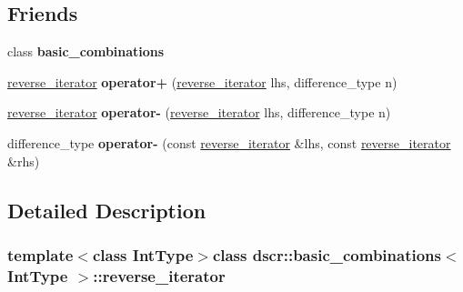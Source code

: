 \subsection*{Friends}
\begin{DoxyCompactItemize}
\item 
\hypertarget{classdscr_1_1basic__combinations_1_1reverse__iterator_a5aee9caa75ebeddad7d54e7f4931ce21}{class {\bfseries basic\-\_\-combinations}}\label{classdscr_1_1basic__combinations_1_1reverse__iterator_a5aee9caa75ebeddad7d54e7f4931ce21}

\item 
\hypertarget{classdscr_1_1basic__combinations_1_1reverse__iterator_a2c7fdd81f663381e951fb677763da73a}{\hyperlink{classdscr_1_1basic__combinations_1_1reverse__iterator}{reverse\-\_\-iterator} {\bfseries operator+} (\hyperlink{classdscr_1_1basic__combinations_1_1reverse__iterator}{reverse\-\_\-iterator} lhs, difference\-\_\-type n)}\label{classdscr_1_1basic__combinations_1_1reverse__iterator_a2c7fdd81f663381e951fb677763da73a}

\item 
\hypertarget{classdscr_1_1basic__combinations_1_1reverse__iterator_ad23e7d190001b7e889291da869e0e825}{\hyperlink{classdscr_1_1basic__combinations_1_1reverse__iterator}{reverse\-\_\-iterator} {\bfseries operator-\/} (\hyperlink{classdscr_1_1basic__combinations_1_1reverse__iterator}{reverse\-\_\-iterator} lhs, difference\-\_\-type n)}\label{classdscr_1_1basic__combinations_1_1reverse__iterator_ad23e7d190001b7e889291da869e0e825}

\item 
\hypertarget{classdscr_1_1basic__combinations_1_1reverse__iterator_a46fe9efd66cb5e2a2e89a93f2e060b82}{difference\-\_\-type {\bfseries operator-\/} (const \hyperlink{classdscr_1_1basic__combinations_1_1reverse__iterator}{reverse\-\_\-iterator} \&lhs, const \hyperlink{classdscr_1_1basic__combinations_1_1reverse__iterator}{reverse\-\_\-iterator} \&rhs)}\label{classdscr_1_1basic__combinations_1_1reverse__iterator_a46fe9efd66cb5e2a2e89a93f2e060b82}

\end{DoxyCompactItemize}


\subsection{Detailed Description}
\subsubsection*{template$<$class Int\-Type$>$class dscr\-::basic\-\_\-combinations$<$ Int\-Type $>$\-::reverse\-\_\-iterator}

